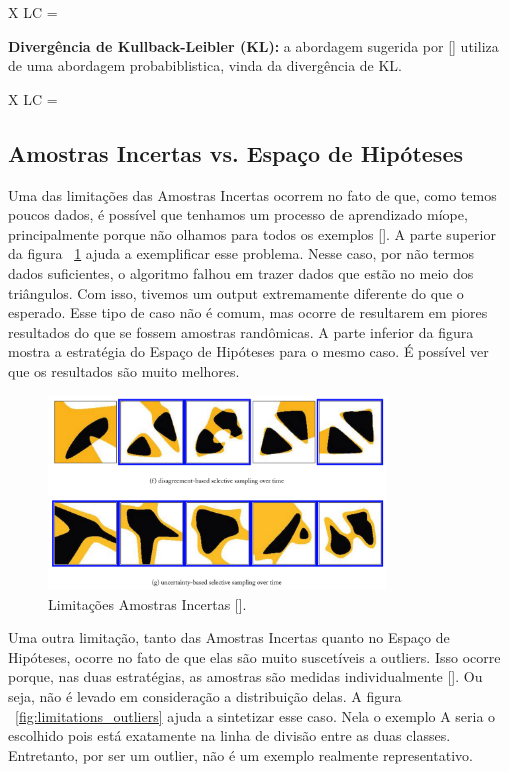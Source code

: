 X {LC} =  

\textbf{Divergência de Kullback-Leibler (KL):} a abordagem sugerida por [\cite{mccallumzy1998employing}] utiliza de uma abordagem probabiblistica, vinda da divergência de KL.

X {LC} =  


\subsection{Amostras Incertas vs. Espaço de Hipóteses} 
\label{sec:minimizing_expected}

Uma das limitações das Amostras Incertas ocorrem no fato de que, como temos poucos dados, é possível que tenhamos um processo de aprendizado míope, principalmente porque não olhamos para todos os exemplos [\cite{settles2014active}]. A parte superior da figura ~\ref{fig:limitations_incertas} ajuda a exemplificar esse problema. Nesse caso, por não termos dados suficientes, o algoritmo falhou em trazer dados que estão no meio dos triângulos. Com isso, tivemos um output extremamente diferente do que o esperado. Esse tipo de caso não é comum, mas ocorre de resultarem em piores resultados do que se fossem amostras randômicas. A parte inferior da figura mostra a estratégia do Espaço de Hipóteses para o mesmo caso. É possível ver que os resultados são muito melhores. 


\begin{figure}
  \centering
  \includegraphics[width=0.8\textwidth]{figures/limitations_incertas.png}
  \caption{Limitações Amostras Incertas [\cite{settles2014active}].}
  \label{fig:limitations_incertas}
\end{figure}

Uma outra limitação, tanto das Amostras Incertas quanto no Espaço de Hipóteses, ocorre no fato de que elas são muito suscetíveis a outliers. Isso ocorre porque, nas duas estratégias, as amostras são medidas individualmente [\cite{settles2014active}]. Ou seja, não é levado em consideração a distribuição delas. A figura ~\ref{fig:limitations_outliers} ajuda a sintetizar esse caso. Nela o exemplo A seria o escolhido pois está exatamente na linha de divisão entre as duas classes. Entretanto, por ser um outlier, não é um exemplo realmente representativo. 


